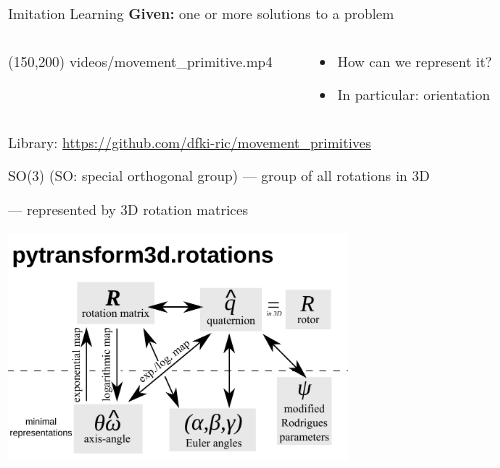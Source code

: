 \documentclass[14pt]{beamer}
\begin{document}
\begin{frame}[fragile]{Imitation Learning}
\textbf{Given:} one or more solutions to a problem

\begin{columns}
\begin{column}{0.43\textwidth}
\makebox(150,200){
{videos/movement_primitive.mp4}}
\end{column}
\begin{column}{0.55\textwidth}
\begin{itemize}
\item How can we represent it?
\item In particular: orientation
\end{itemize}
\end{column}
\end{columns}

{\footnotesize Library:
\url{https://github.com/dfki-ric/movement_primitives}}
\end{frame}

\begin{frame}{SO(3) (SO: special orthogonal group)}
--- group of all rotations in 3D

--- represented by 3D rotation matrices

\vfill

\begin{center}
\includegraphics[width=9cm]{images/rotations}
\end{center}
\end{frame}
\end{document}
